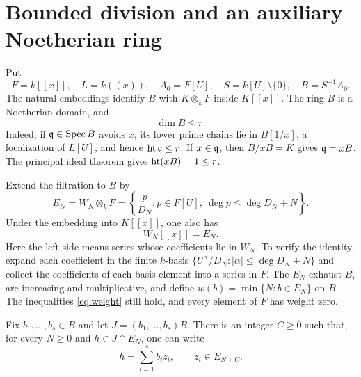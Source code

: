 \section{Bounded division and an auxiliary Noetherian ring}
\label{sec:division}

Put
\begin{equation}\label{eq:B}
 F=k[[x]],\quad L=k((x)),\quad A_0=F[U],\quad
 S=k[U]\setminus\{0\},\quad B=S^{-1}A_0.
\end{equation}
The natural embeddings identify $B$ with $K\otimes_kF$ inside
$K[[x]]$. The ring $B$ is a Noetherian domain, and
\begin{equation}\label{eq:Bdim}
 \dim B\le r.
\end{equation}
Indeed, if $\mathfrak q\in\operatorname{Spec} B$ avoids $x$, its lower prime chains lie
in $B[1/x]$, a localization of $L[U]$, and hence $\operatorname{ht}\mathfrak q\le r$.
If $x\in\mathfrak q$, then $B/xB=K$ gives $\mathfrak q=xB$. The principal ideal
theorem gives $\operatorname{ht}(xB)=1\le r$.

Extend the filtration to $B$ by
\begin{equation}\label{eq:E}
 E_N=W_N\otimes_kF
 =\left\{\frac{p}{D_N}:p\in F[U],\
                    \deg p\le\deg D_N+N\right\}.
\end{equation}
Under the embedding into $K[[x]]$, one also has
\begin{equation}\label{eq:finite-basis}
 W_N[[x]]=E_N.
\end{equation}
Here the left side means series whose coefficients lie in $W_N$.
To verify the identity, expand each coefficient in the finite
$k$-basis $\{U^\alpha/D_N:|\alpha|\le\deg D_N+N\}$ and collect
the coefficients of each basis element into a series in $F$.
The $E_N$ exhaust $B$, are increasing and multiplicative, and define
$w(b)=\min\{N:b\in E_N\}$ on $B$. The inequalities
\eqref{eq:weight} still hold, and every element of $F$ has weight zero.

\begin{lemma}\label{lem:division}
Fix $b_1,\ldots,b_s\in B$ and let $J=(b_1,\ldots,b_s)B$.
There is an integer $C\ge0$ such that, for every $N\ge0$ and
$h\in J\cap E_N$, one can write
\begin{equation}\label{eq:division}
 h=\sum_{i=1}^{s}b_i z_i,\qquad z_i\in E_{N+C}.
\end{equation}
\end{lemma}

